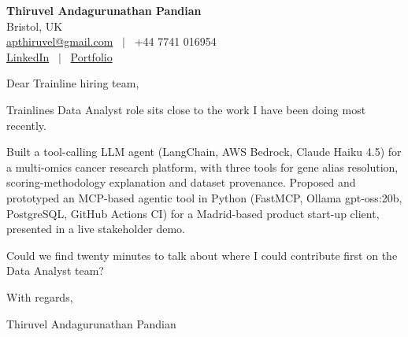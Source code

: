 \documentclass[11pt,a4paper]{article}
\begin{document}
\raggedright
\pagestyle{empty}

\begin{center}
    {\LARGE \color{linkblue} \textbf{Thiruvel Andagurunathan Pandian}}\\[0.2cm]
    Bristol, UK \\
    \href{mailto:apthiruvel@gmail.com}{apthiruvel@gmail.com} \ $|$ \ +44 7741 016954 \\
\href{https://www.linkedin.com/in/thiruvel-a-p/}{LinkedIn} \ $|$ \ \href{https://thiruvel-ap.github.io/PersonalPortfolio/}{Portfolio}
\end{center}

\vspace{0.4cm}

\noindent
Dear Trainline hiring team,

Trainline\textquotesingle{}s Data Analyst role sits close to the work I have been doing most recently.

Built a tool-calling LLM agent (LangChain, AWS Bedrock, Claude Haiku 4.5) for a multi-omics cancer research platform, with three tools for gene alias resolution, scoring-methodology explanation and dataset provenance. Proposed and prototyped an MCP-based agentic tool in Python (FastMCP, Ollama gpt-oss:20b, PostgreSQL, GitHub Actions CI) for a Madrid-based product start-up client, presented in a live stakeholder demo.

Could we find twenty minutes to talk about where I could contribute first on the Data Analyst team?

\vspace{0.5cm}

With regards,

Thiruvel Andagurunathan Pandian
\end{document}
